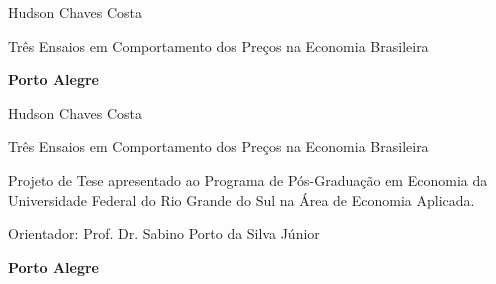 \documentclass[twoside,a4paper,11pt]{report}
\newcommand{\nomedoaluno}{Hudson Chaves Costa}
\newcommand{\titulo}{Três Ensaios em Comportamento dos Preços na Economia Brasileira}
\begin{document}

\pagestyle{empty}

\begin{titlepage}


\begin{center}
{\LARGE \nomedoaluno}
\par
\vspace{200pt}
{\Huge \titulo}
\par
\vfill
\textbf{{\large Porto Alegre}\\
{\large \the\year}}
\end{center}
\end{titlepage}

\cleardoublepage




\thispagestyle{empty}

\begin{center}
{\LARGE \nomedoaluno}
\par
\vspace{200pt}
{\Huge \titulo}
\end{center}
\par
\vspace{90pt}
\hspace*{175pt}\parbox{7.6cm}{{\large Projeto de Tese apresentado ao Programa de Pós-Graduação em Economia da Universidade Federal do Rio Grande do Sul na Área de Economia Aplicada.}}

\par
\vspace{1em}
\hspace*{175pt}\parbox{7.6cm}{{\large Orientador: Prof. Dr. Sabino Porto da Silva Júnior}}

\par
\vfill
\begin{center}
\textbf{{\large Porto Alegre}\\
{\large \the\year}}
\end{center}
\end{document}

